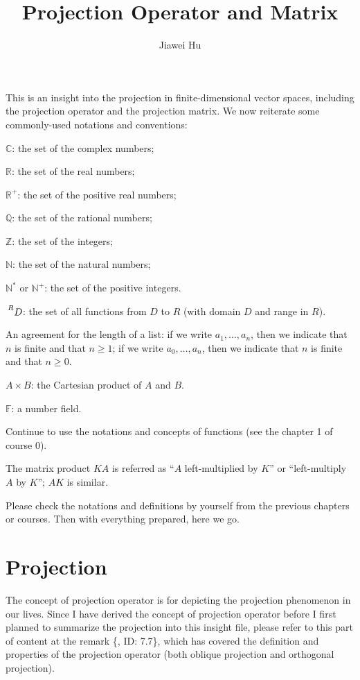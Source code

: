 \documentclass{article}
\title{\LARGE \textbf{Projection Operator and Matrix}}
\author{\large Jiawei Hu}
\begin{document}
\maketitle

This is an insight into the projection in finite-dimensional vector spaces, including the projection operator and the projection matrix. We now reiterate some commonly-used notations and conventions:
\begin{compactenum}
    \item $\mathbb{C}$: the set of the complex numbers;
    \item $\mathbb{R}$: the set of the real numbers;
    \item $\mathbb{R}^+$: the set of the positive real numbers;
    \item $\mathbb{Q}$: the set of the rational numbers;
    \item $\mathbb{Z}$: the set of the integers;
    \item $\mathbb{N}$: the set of the natural numbers;
    \item $\mathbb{N^\ast}$ or $\mathbb{N}^+$: the set of the positive integers.
    \item $\sideset{^R}{}{\mathop{D}}$: the set of all functions from $D$ to $R$ (with domain $D$ and range in $R$).
    \item An agreement for the length of a list: if we write $a_1, \dots, a_n$, then we indicate that $n$ is finite and that $n\geq 1$; if we write $a_0, \dots, a_n$, then we indicate that $n$ is finite and that $n\geq 0$.
    \item $A\times B$: the Cartesian product of $A$ and $B$.
    \item $\mathbb{F}$: a number field.
    \item Continue to use the notations and concepts of functions (see the chapter 1 of course 0).
    \item The matrix product $KA$ is referred as ``$A$ left-multiplied by $K$'' or ``left-multiply $A$ by $K$''; $AK$ is similar.
\end{compactenum} 
Please check the notations and definitions by yourself from the previous chapters or courses. Then with everything prepared, here we go.

\section{Projection}

The concept of projection operator is for depicting the projection phenomenon in our lives. Since I have derived the concept of projection operator before I first planned to summarize the projection into this insight file, please refer to this part of content at the remark \{, ID: 7.7\}, which has covered the definition and properties of the projection operator (both oblique projection and orthogonal projection).
\end{document}
